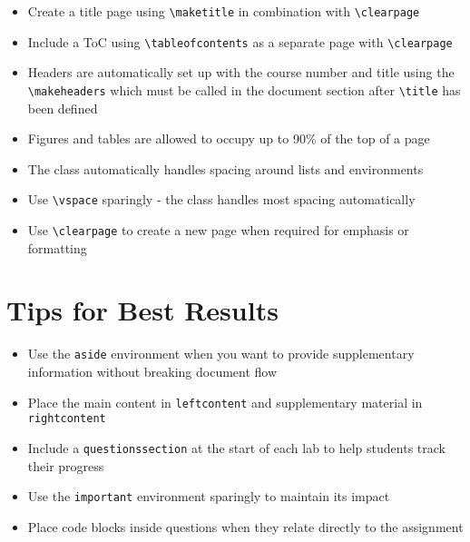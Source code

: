 \documentclass[12pt]{labmanual}
\begin{document}
\begin{itemize}
\item Create a title page using \verb|\maketitle| in combination with \verb|\clearpage|
\item Include a ToC using \verb|\tableofcontents| as a separate page with \verb|\clearpage|
\item Headers are automatically set up with the course number and title using the \verb|\makeheaders| which must be called in the document section after \verb|\title| has been defined
\item Figures and tables are allowed to occupy up to 90\% of the top of a page
\item The class automatically handles spacing around lists and environments
\item Use \verb|\vspace| sparingly - the class handles most spacing automatically
\item Use \verb|\clearpage| to create a new page when required for emphasis or formatting
\end{itemize}

\section{Tips for Best Results}

\begin{itemize}
\item Use the \texttt{aside} environment when you want to provide supplementary information without breaking document flow
\item Place the main content in \texttt{leftcontent} and supplementary material in \texttt{rightcontent}
\item Include a \texttt{questionssection} at the start of each lab to help students track their progress
\item Use the \texttt{important} environment sparingly to maintain its impact
\item Place code blocks inside questions when they relate directly to the assignment
\end{itemize}
\end{document}
